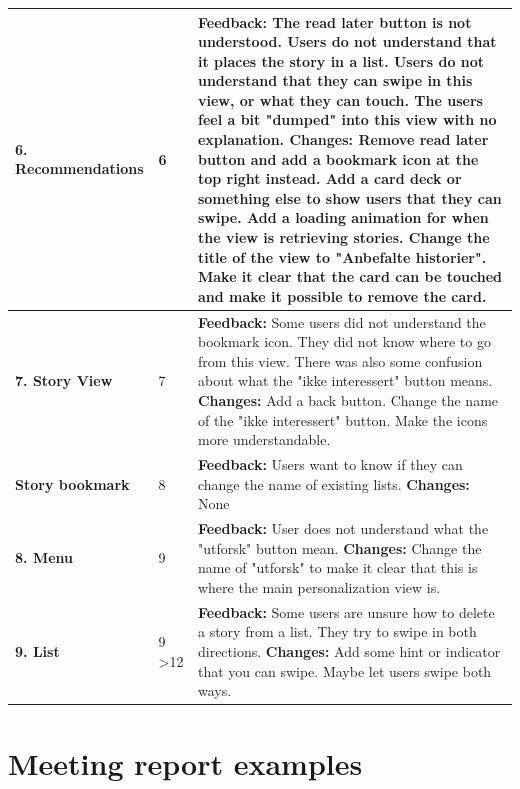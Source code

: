 \begin{appendices}
\begin{center}
\begin{longtable}{ | p{3.7cm} | p{1cm} | p{13cm}|}
		\textbf{6. Recommendations} & 6 & 
		\textbf{Feedback:} The read later button is not understood. Users do not understand that it places the story in a list. Users do not understand that they can swipe in this view, or what they can touch. The users feel a bit "dumped" into this view with no explanation.\newline
		\textbf{Changes:} Remove read later button and add a bookmark icon at the top right instead. Add a card deck or something else to show users that they can swipe. Add a loading animation for when the view is retrieving stories. Change the title of the view to "Anbefalte historier". Make it clear that the card can be touched and make it possible to remove the card.
		\\\hline
		
		\textbf{7. Story View} & 7 & 
		\textbf{Feedback:} Some users did not understand the bookmark icon. They did not know where to go from this view. There was also some confusion about what the "ikke interessert" button means.\newline 
		\textbf{Changes:} Add a back button. Change the name of the "ikke interessert" button. Make the icons more understandable.
		\\\hline
		
		\textbf{Story bookmark} & 8  & 
		\textbf{Feedback:} Users want to know if they can change the name of existing lists.\newline
		\textbf{Changes:} None	
		\\\hline
		
		\textbf{8. Menu} & 9  &
		\textbf{Feedback:} User does not understand what the "utforsk" button mean.\newline
		\textbf{Changes:} Change the name of "utforsk" to make it clear that this is where the main personalization view is.		
		\\\hline
		
		\textbf{9. List} & 9 \textgreater 12 &
		\textbf{Feedback:} Some users are unsure how to delete a story from a list. They try to swipe in both directions.\newline
		\textbf{Changes:} Add some hint or indicator that you can swipe. Maybe let users swipe both ways.
		\\\hline
	\end{longtable}
\end{center}


	
\chapter{Meeting report examples}
\label{app:meetingreport}


\end{appendices}
